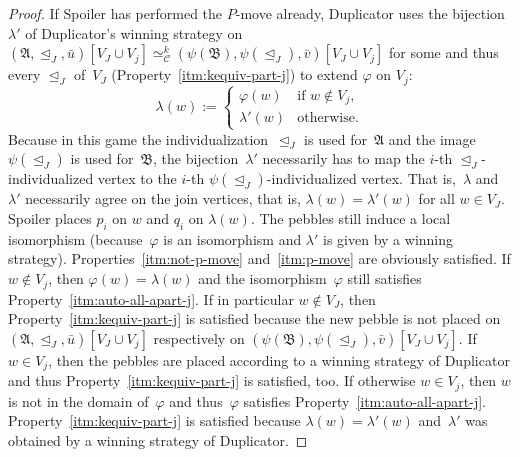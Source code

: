 \documentclass[]{lmcs}
\renewcommand{\phi}{\varphi}
\newcommand{\auto}{\phi}
\newcommand{\autoA}{\phi}
\newcommand{\autoB}{\psi}
\newcommand{\tup}[1]{\bar{#1}}
\newcommand{\vertA}{u}
\newcommand{\vertB}{v}
\newcommand{\vertC}{w}
\newcommand{\StructA}{\mathfrak{A}}
\newcommand{\StructB}{\mathfrak{B}}
\newcommand{\gamebij}{\lambda}
\newcommand{\kequiv}[1]{\simeq^#1_{\mathcal{C}}}
\newcommand{\indRel}{\trianglelefteq}
\begin{document}
\begin{proof}
	If Spoiler has performed the $P$-move already,
	Duplicator uses the bijection $\gamebij'$
	of Duplicator's winning strategy on $(\StructA,\indRel_J, \tup{\vertA})[V_J \cup V_j] \kequiv{k}
	(\autoB(\StructB),\autoB(\indRel_J), \tup{\vertB})[V_J \cup V_j]$
	for some and thus every $\indRel_J$ of~$V_J$
	(Property~\ref{itm:kequiv-part-j}) to extend $\autoA$ on $V_j$:
	\[\gamebij(\vertC) := \begin{cases}
		\auto(\vertC) & \text{if } \vertC \notin V_j,\\
		\gamebij'(\vertC) &\text{otherwise.}
	\end{cases}\]
	Because in this game the individualization~$\indRel_J$ is used for~$\StructA$
	and the image~$\autoB(\indRel_J)$ is used for~$\StructB$,
	the bijection~$\gamebij'$ necessarily has to map the $i$-th $\indRel_J$-individualized vertex 
	to the $i$-th ${\autoB(\indRel_J)}$\nobreakdash-individualized vertex.
	That is,~$\gamebij$ and~$\gamebij'$ necessarily agree on the join vertices,
	that is, $\gamebij(\vertC) = \gamebij'(\vertC)$ for all $\vertC \in V_J$.
	Spoiler places $p_i$ on $\vertC$ and $q_i$ on $\gamebij(\vertC)$.
	The pebbles still induce a local isomorphism
	(because~$\autoA$ is an isomorphism and $\gamebij'$ is given by a winning strategy).
	Properties~\ref{itm:not-p-move} and~\ref{itm:p-move}
	are obviously satisfied.
	If $\vertC \notin V_j$, then $\autoA(\vertC) = \gamebij(\vertC)$
	and the isomorphism~$\autoA$ still satisfies Property~\ref{itm:auto-all-apart-j}.
	If in particular $\vertC \notin V_J$,
	then Property~\ref{itm:kequiv-part-j} is satisfied because the new pebble is not placed on ${(\StructA,\indRel_J, \tup{\vertA})[V_J \cup V_j]}$ respectively on ${(\autoB(\StructB),\autoB(\indRel_J), \tup{\vertB})[V_J \cup V_j]}$.
	If $\vertC \in V_j$,
	then the pebbles are placed according to a winning strategy of Duplicator
	and thus Property~\ref{itm:kequiv-part-j} is satisfied, too.
	If otherwise $\vertC \in V_j$, then $\vertC$ is not in the domain of~$\autoA$ and thus~$\autoA$ satisfies Property~\ref{itm:auto-all-apart-j}.
	Property~\ref{itm:kequiv-part-j} is satisfied because $\gamebij(\vertC) = \gamebij'(\vertC)$
	and~$\gamebij'$ was obtained by a winning strategy of Duplicator.
	

\end{proof}
\end{document}
